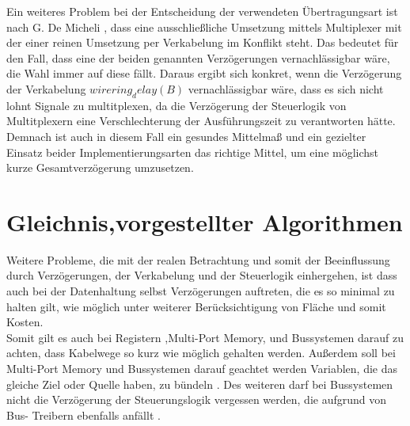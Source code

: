 \documentclass[conference]{IEEEtran}
\begin{document}
 Ein weiteres Problem bei der Entscheidung
der verwendeten Übertragungsart ist nach G. De Micheli
\cite[S.250]{3}, dass eine ausschließliche Umsetzung mittels
Multiplexer mit der einer reinen Umsetzung per Verkabelung
im Konflikt steht. Das bedeutet für den Fall, dass eine der
beiden genannten Verzögerungen vernachlässigbar wäre, die
Wahl immer auf diese fällt. Daraus ergibt sich konkret, wenn
die Verzögerung der Verkabelung $wirering_delay(B)$ vernachlässigbar
wäre, dass es sich nicht lohnt Signale zu multitplexen,
da die Verzögerung der Steuerlogik von Multitplexern
eine Verschlechterung der Ausführungszeit zu verantworten
hätte.\\
Demnach ist auch in diesem Fall ein gesundes Mittelmaß
und ein gezielter Einsatz beider Implementierungsarten das
richtige Mittel, um eine möglichst kurze Gesamtverzögerung
umzusetzen.

\section{Gleichnis,vorgestellter Algorithmen}
Weitere Probleme, die mit der realen Betrachtung und somit
der Beeinflussung durch Verzögerungen, der Verkabelung und
der Steuerlogik einhergehen, ist dass auch bei der Datenhaltung
selbst Verzögerungen auftreten, die es so minimal zu
halten gilt, wie möglich unter weiterer Berücksichtigung von
Fläche und somit Kosten.\\
Somit gilt es auch bei Registern ,Multi-Port Memory, und
Bussystemen darauf zu achten, dass Kabelwege so kurz wie
möglich gehalten werden. Außerdem soll bei Multi-Port Memory
und Bussystemen darauf geachtet werden Variablen, die
das gleiche Ziel oder Quelle haben, zu bündeln \cite[S.250]{3}.
Des weiteren darf bei Bussystemen nicht die Verzögerung
der Steuerungslogik vergessen werden, die aufgrund von Bus-
Treibern ebenfalls anfällt \cite[S.250]{3}.
\end{document}
